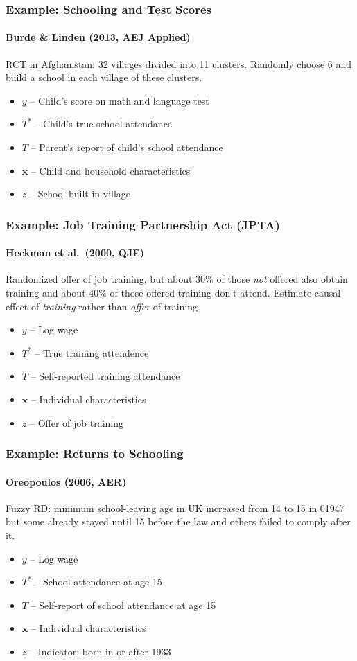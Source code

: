 \documentclass{beamer}
\begin{document}
\begin{frame}
  \frametitle{Example: Schooling and Test Scores}
\framesubtitle{Burde \& Linden (2013, AEJ Applied)}
  RCT in Afghanistan: 32 villages divided into 11 clusters. Randomly choose 6 and build a school in each village of these clusters.

\begin{itemize}
  \item $y$ -- Child's score on math and language test 
  \item $T^*$ -- Child's true school attendance
  \item $T$ -- Parent's report of child's school attendance
  \item $\mathbf{x}$ -- Child and household characteristics
  \item $z$ -- School built in village
\end{itemize}
\end{frame}
\begin{frame}
  \frametitle{Example: Job Training Partnership Act (JPTA)}
\framesubtitle{Heckman et al.\ (2000, QJE)}
Randomized offer of job training, but about $30\%$ of those \emph{not} offered also obtain training and about $40\%$ of those offered training don't attend. Estimate causal effect of \emph{training} rather than \emph{offer} of training.

\begin{itemize}
  \item $y$ -- Log wage 
  \item $T^*$ -- True training attendence
  \item $T$ -- Self-reported training attendance
  \item $\mathbf{x}$ -- Individual characteristics
  \item $z$ -- Offer of job training
\end{itemize}
   
\end{frame}
\begin{frame}
  \frametitle{Example: Returns to Schooling} 
\framesubtitle{Oreopoulos (2006, AER)}
Fuzzy RD: minimum school-leaving age in UK increased from 14 to 15 in 01947 but some already stayed until 15 before the law and others failed to comply after it.
\begin{itemize}
  \item $y$ -- Log wage 
  \item $T^*$ -- School attendance at age 15
  \item $T$ -- Self-report of school attendance at age 15
  \item $\mathbf{x}$ -- Individual characteristics
  \item $z$ -- Indicator: born in or after 1933
\end{itemize}
   
\end{frame}
\end{document}
